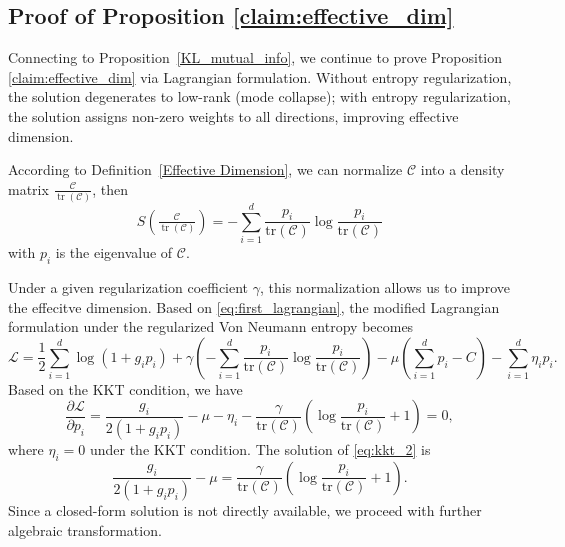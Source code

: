 \documentclass{article} %
\begin{document}
\subsection{Proof of Proposition \ref{claim:effective_dim}}
\label{claim:effective_dim_von_neumann}
Connecting to Proposition~\ref{KL_mutual_info}, we continue to prove Proposition \ref{claim:effective_dim} via Lagrangian formulation. Without entropy regularization, the solution degenerates to low-rank (mode collapse); with entropy regularization, the solution assigns non-zero weights to all directions, improving effective dimension. 
\begin{proofwithframe}
According to Definition~\ref{Effective Dimension}, we can normalize $\mathcal{C}$ into a density matrix $\tfrac{\mathcal{C}}{\operatorname{tr}(\mathcal{C})}$, then
\[
S(\tfrac{\mathcal{C}}{\operatorname{tr}(\mathcal{C})}) = - \sum_{i=1}^d \frac{p_i}{\mathrm{tr}(\mathcal{C})} \log  \frac{p_i}{\mathrm{tr}(\mathcal{C})}
\]
with $p_i$ is the eigenvalue of $\mathcal{C}$. 

Under a given regularization coefficient $\gamma$, this normalization allows us to improve the effecitve dimension. Based on \eqref{eq:first_lagrangian}, the modified Lagrangian formulation under the regularized Von Neumann entropy becomes 
\begin{equation} \label{eq:lagrangian_2}
        \mathcal{L} = \frac{1}{2} \sum_{i=1}^d \log (1+ g_i p_i) + \gamma(- \sum_{i=1}^d \frac{p_i}{\mathrm{tr}(\mathcal{C})} \log  \frac{p_i}{\mathrm{tr}(\mathcal{C})} ) - \mu (\sum_{i = 1}^d p_i - C  ) - \sum_{i = 1}^d \eta_i p_i. 
\end{equation}
Based on the KKT condition, we have 
\begin{equation} \label{eq:kkt_2}
    \frac{\partial \mathcal{L}}{\partial p_i} = \frac{g_i}{ 2(1+g_ip_i)} - \mu - \eta_i - \frac{\gamma}{\mathrm{tr}(\mathcal{C})} ( \log \frac{p_i}{\mathrm{tr}(\mathcal{C})} + 1) = 0,
\end{equation}
where $\eta_i = 0$ under the KKT condition. The solution of \eqref{eq:kkt_2} is 
\[
\frac{g_i}{ 2(1+g_ip_i)} - \mu = \frac{\gamma}{\mathrm{tr}(\mathcal{C})} ( \log \frac{p_i}{\mathrm{tr}(\mathcal{C})} + 1). 
\]
Since a closed-form solution is not directly available, we proceed with further algebraic transformation.


\end{proofwithframe}
\end{document}
